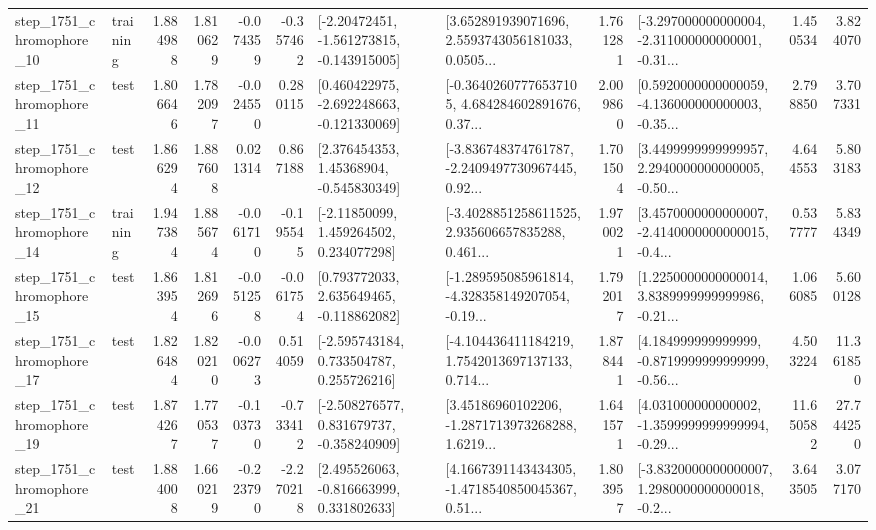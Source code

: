 \begin{tabular}{llrrrrllrlrr}
 step\_1751\_chromophore\_10 &  training &      1.884988 &    1.810629 &     -0.074359 & -0.357462 &   [-2.20472451, -1.561273815, -0.143915005] &  [3.652891939071696, 2.5593743056181033, 0.0505... &       1.761281 &  [-3.297000000000004, -2.311000000000001, -0.31... &            1.450534 &          3.824070 \\
 step\_1751\_chromophore\_11 &      test &      1.806646 &    1.782097 &     -0.024550 &  0.280115 &   [0.460422975, -2.692248663, -0.121330069] &  [-0.36402607776537105, 4.684284602891676, 0.37... &       2.009860 &  [0.5920000000000059, -4.136000000000003, -0.35... &            2.798850 &          3.707331 \\
 step\_1751\_chromophore\_12 &      test &      1.866294 &    1.887608 &      0.021314 &  0.867188 &     [2.376454353, 1.45368904, -0.545830349] &  [-3.836748374761787, -2.2409497730967445, 0.92... &       1.701504 &  [3.4499999999999957, 2.2940000000000005, -0.50... &            4.644553 &          5.803183 \\
 step\_1751\_chromophore\_14 &  training &      1.947384 &    1.885674 &     -0.061710 & -0.195545 &     [-2.11850099, 1.459264502, 0.234077298] &  [-3.4028851258611525, 2.935606657835288, 0.461... &       1.970021 &  [3.4570000000000007, -2.4140000000000015, -0.4... &            0.537777 &          5.834349 \\
 step\_1751\_chromophore\_15 &      test &      1.863954 &    1.812696 &     -0.051258 & -0.061754 &    [0.793772033, 2.635649465, -0.118862082] &  [-1.289595085961814, -4.328358149207054, -0.19... &       1.792017 &  [1.2250000000000014, 3.8389999999999986, -0.21... &            1.066085 &          5.600128 \\
 step\_1751\_chromophore\_17 &      test &      1.826484 &    1.820210 &     -0.006273 &  0.514059 &    [-2.595743184, 0.733504787, 0.255726216] &  [-4.104436411184219, 1.7542013697137133, 0.714... &       1.878441 &  [4.184999999999999, -0.8719999999999999, -0.56... &            4.503224 &         11.361850 \\
 step\_1751\_chromophore\_19 &      test &      1.874267 &    1.770537 &     -0.103730 & -0.733412 &   [-2.508276577, 0.831679737, -0.358240909] &  [3.45186960102206, -1.2871713973268288, 1.6219... &       1.641571 &  [4.031000000000002, -1.3599999999999994, -0.29... &           11.650582 &         27.744250 \\
 step\_1751\_chromophore\_21 &      test &      1.884008 &    1.660219 &     -0.223790 & -2.270218 &    [2.495526063, -0.816663999, 0.331802633] &  [4.1667391143434305, -1.4718540850045367, 0.51... &       1.803957 &  [-3.8320000000000007, 1.2980000000000018, -0.2... &            3.643505 &          3.077170 \\

\end{tabular}
